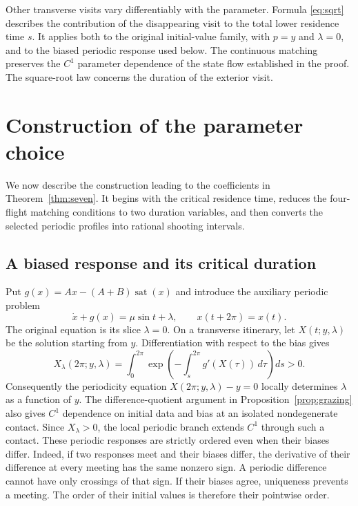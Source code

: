 \documentclass[11pt,a4paper]{article}
\newcommand{\sat}{\operatorname{sat}}
\begin{document}
Other transverse visits vary differentiably with the parameter. Formula
\eqref{eq:sqrt} describes the contribution of the disappearing visit
to the total lower residence time $s$. It applies both to the original
initial-value family, with $p=y$ and $\lambda=0$, and to the biased
periodic response used below.
The continuous matching preserves the $C^1$ parameter dependence of
the state flow established in the proof. The square-root law concerns
the duration of the exterior visit.

\section{Construction of the parameter choice}\label{sec:construction}
We now describe the construction leading to the coefficients in
Theorem~\ref{thm:seven}. It begins with the critical residence time,
reduces the four-flight matching conditions to two duration variables,
and then converts the selected periodic profiles into rational shooting
intervals.

\subsection{A biased response and its critical duration}
Put $g(x)=Ax-(A+B)\sat(x)$ and introduce the auxiliary periodic problem
\begin{equation}\label{eq:biased}
 \dot x+g(x)=\mu\sin t+\lambda,\qquad x(t+2\pi)=x(t).
\end{equation}
The original equation is its slice $\lambda=0$. On a transverse
itinerary, let $X(t;y,\lambda)$ be the solution starting from $y$.
Differentiation with respect to the bias gives
\[
 X_\lambda(2\pi;y,\lambda)
 =\int_0^{2\pi}\exp\left(-\int_s^{2\pi}g'(X(\tau))\,d\tau\right)ds>0.
\]
Consequently the periodicity equation
$X(2\pi;y,\lambda)-y=0$ locally determines $\lambda$ as a function of $y$.
The difference-quotient argument in Proposition~\ref{prop:grazing}
also gives $C^1$ dependence on initial data and bias at an isolated
nondegenerate contact. Since $X_\lambda>0$, the local periodic branch
extends $C^1$ through such a contact.
These periodic responses are strictly ordered even when their biases
differ. Indeed, if two responses meet and their biases differ, the
derivative of their difference at every meeting has the same nonzero
sign. A periodic difference cannot have only crossings of that sign.
If their biases agree, uniqueness prevents a meeting. The order of
their initial values is therefore their pointwise order.
\end{document}
